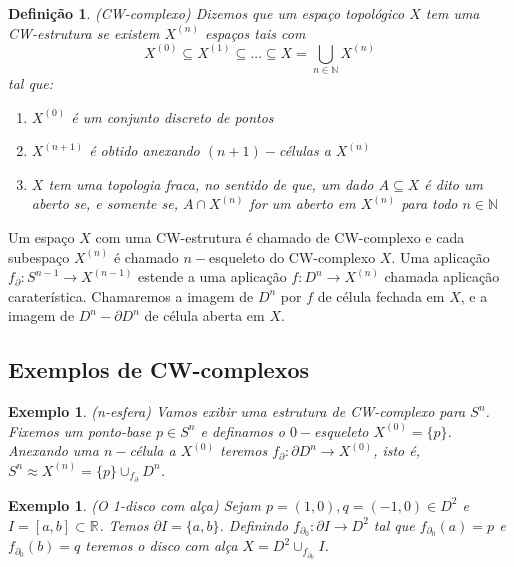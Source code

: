 \documentclass[12pt]{book}
\newtheorem{definicao}[teorema]{Definição}
\newtheorem{exemplo}[teorema]{Exemplo}
\newcommand{\celula}[2]{D^{#1}_{#2}}
\newcommand{\real}[1]{\mathbb{R}^{#1}}
\newcommand{\reta}{\real{}}
\newcommand{\skeleton}[1]{X^{(#1)}}
\begin{document}
	\begin{definicao}
		(CW-complexo) Dizemos que um espaço topológico $X$ tem uma CW-estrutura se existem $\skeleton{n}$ espaços tais com 
		$$
		\skeleton{0} \subseteq \skeleton{1} \subseteq \dots \subseteq X = \bigcup \limits_{n\in \mathbb{N}} \skeleton{n}
		$$ 
		tal que:
		\begin{enumerate}
			\item $\skeleton{0}$ é um conjunto discreto de pontos
			\item $\skeleton{n+1}$ é obtido anexando $(n+1)-$células a $\skeleton{n}$
			\item $X$ tem uma topologia fraca, no sentido de que, um dado $A \subseteq X$ é dito um aberto se, e somente se, $A \cap \skeleton{n}$ for um aberto em $\skeleton{n}$ para todo $n \in \mathbb{N}$
		\end{enumerate}
	\end{definicao}
	
	Um espaço $X$ com uma CW-estrutura é chamado de CW-complexo e cada subespaço $\skeleton{n}$ é chamado $n-$esqueleto do CW-complexo $X$. Uma aplicação $f_{\partial}:S^{n-1} \to \skeleton{n-1}$ estende a uma aplicação $f:D^{n} \to \skeleton{n}$ chamada aplicação caraterística. Chamaremos a imagem de $D^{n}$ por $f$ de célula fechada em $X$, e a imagem de $D^{n} - \partial D^{n}$ de célula aberta em $X$.
	
	\subsection{Exemplos de CW-complexos}
	\begin{exemplo}
		(n-esfera) Vamos exibir uma estrutura de CW-complexo para $S^{n}$. Fixemos um ponto-base $p \in S^{n}$ e definamos o $0-$esqueleto $\skeleton{0}=\{p\}$. Anexando uma $n-$célula a $\skeleton{0}$ teremos $f_{\partial}: \partial D^{n} \to \skeleton{0}$, isto é, $S^{n} \approx \skeleton{n} = \{p\}\cup_{f_{\partial}} \celula{n}{}$.
	\end{exemplo}
	
	\begin{exemplo}
		(O 1-disco com alça) Sejam $p=(1,0), q=(-1,0) \in D^{2}$ e $I=[a,b] \subset \reta$. Temos $\partial I=\{a,b\}$. Definindo $f_{\partial_{0}}: \partial I \to D^{2}$ tal que $f_{\partial_{0}}(a)=p$ e $f_{\partial_{0}}(b)=q$ teremos o disco com alça $X=D^{2}\cup_{f_{\partial_{0}}}I$.   
	\end{exemplo}
	
\end{document}
